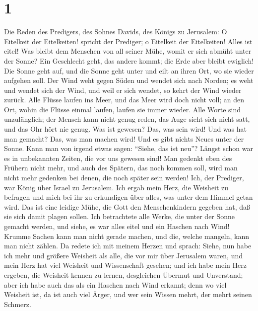 \hypertarget{section}{%
\section{1}\label{section}}

 Die Reden des Predigers, des Sohnes Davids, des Königs zu
Jerusalem:  O Eitelkeit der Eitelkeiten! spricht der
Prediger; o Eitelkeit der Eitelkeiten! Alles ist eitel! 
Was bleibt dem Menschen von all seiner Mühe, womit er sich abmüht unter
der Sonne?  Ein Geschlecht geht, das andere kommt; die
Erde aber bleibt ewiglich!  Die Sonne geht auf, und die
Sonne geht unter und eilt an ihren Ort, wo sie wieder aufgehen soll.
 Der Wind weht gegen Süden und wendet sich nach Norden; es
weht und wendet sich der Wind, und weil er sich wendet, so kehrt der
Wind wieder zurück.  Alle Flüsse laufen ins Meer, und das
Meer wird doch nicht voll; an den Ort, wohin die Flüsse einmal laufen,
laufen sie immer wieder.  Alle Worte sind unzulänglich;
der Mensch kann nicht genug reden, das Auge sieht sich nicht satt, und
das Ohr hört nie genug.  Was ist gewesen? Das, was sein
wird! Und was hat man gemacht? Das, was man machen wird! Und es gibt
nichts Neues unter der Sonne.  Kann man von irgend etwas
sagen: ``Siehe, das ist neu''? Längst schon war es in unbekannten
Zeiten, die vor uns gewesen sind!  Man gedenkt eben des
Frühern nicht mehr, und auch des Spätern, das noch kommen soll, wird man
nicht mehr gedenken bei denen, die noch später sein werden!
 Ich, der Prediger, war König über Israel zu Jerusalem.
 Ich ergab mein Herz, die Weisheit zu befragen und mich
bei ihr zu erkundigen über alles, was unter dem Himmel getan wird. Das
ist eine leidige Mühe, die Gott den Menschenkindern gegeben hat, daß sie
sich damit plagen sollen.  Ich betrachtete alle Werke,
die unter der Sonne gemacht werden, und siehe, es war alles eitel und
ein Haschen nach Wind!  Krumme Sachen kann man nicht
gerade machen, und die, welche mangeln, kann man nicht zählen.
 Da redete ich mit meinem Herzen und sprach: Siehe, nun
habe ich mehr und größere Weisheit als alle, die vor mir über Jerusalem
waren, und mein Herz hat viel Weisheit und Wissenschaft gesehen;
 und ich habe mein Herz ergeben, die Weisheit kennen zu
lernen, desgleichen Übermut und Unverstand; aber ich habe auch das als
ein Haschen nach Wind erkannt;  denn wo viel Weisheit
ist, da ist auch viel Ärger, und wer sein Wissen mehrt, der mehrt seinen
Schmerz.


